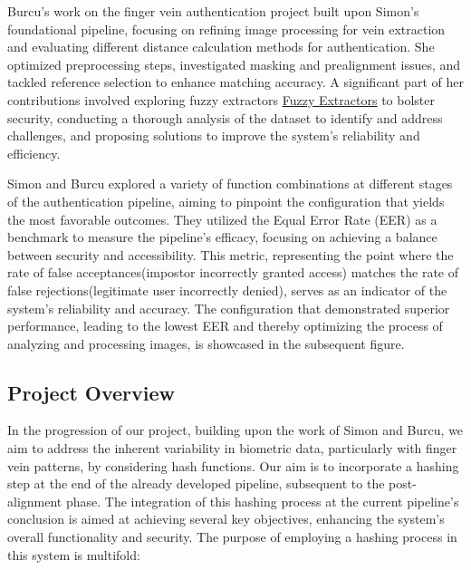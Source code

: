 Burcu's work on the finger vein authentication project built upon Simon's foundational pipeline, focusing on refining image processing for vein extraction and evaluating different distance calculation methods for authentication. She optimized preprocessing steps, investigated masking and prealignment issues, and tackled reference selection to enhance matching accuracy. A significant part of her contributions involved exploring fuzzy extractors \hyperref[def:Fuzzy_Extractors]{Fuzzy Extractors} to bolster security, conducting a thorough analysis of the dataset to identify and address challenges, and proposing solutions to improve the system's reliability and efficiency.

Simon and Burcu explored a variety of function combinations at different stages of the authentication pipeline, aiming to pinpoint the configuration that yields the most favorable outcomes. They utilized the Equal Error Rate (EER) as a benchmark to measure the pipeline's efficacy, focusing on achieving a balance between security and accessibility. This metric, representing the point where the rate of false acceptances(impostor incorrectly granted access) matches the rate of false rejections(legitimate user incorrectly denied), serves as an indicator of the system's reliability and accuracy. The configuration that demonstrated superior performance, leading to the lowest EER and thereby optimizing the process of analyzing and processing images, is showcased in the subsequent figure.


\subsection{Project Overview}

In the progression of our project, building upon the work of Simon and Burcu, we aim to address the inherent variability in biometric data, particularly with finger vein patterns, by considering hash functions. Our aim is to incorporate a hashing step at the end of the already developed pipeline, subsequent to the post-alignment phase. The integration of this hashing process at the current pipeline's conclusion is aimed at achieving several key objectives, enhancing the system's overall functionality and security. The purpose of employing a hashing process in this system is multifold:

